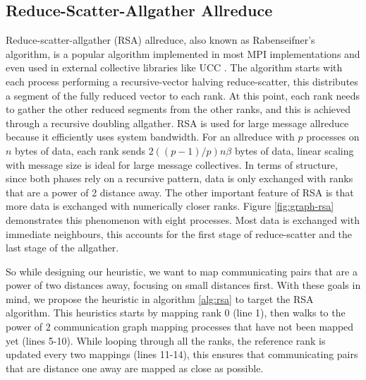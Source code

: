 

\subsection{Reduce-Scatter-Allgather Allreduce}
Reduce-scatter-allgather (RSA) allreduce, also known as Rabenseifner's algorithm, is a popular algorithm implemented in most MPI implementations and even used in external collective libraries like UCC \cite{UCC}.
The algorithm starts with each process performing a recursive-vector halving reduce-scatter, this distributes a segment of the fully reduced vector to each rank.
At this point, each rank needs to gather the other reduced segments from the other ranks, and this is achieved through a recursive doubling allgather.
RSA is used for large message allreduce because it efficiently uses system bandwidth.
For an allreduce with $p$ processes on $n$ bytes of data, each rank sends $2((p-1)/p)n\beta$ bytes of data, linear scaling with message size is ideal for large message collectives.
In terms of structure, since both phases rely on a recursive pattern, data is only exchanged with ranks that are a power of 2 distance away.
The other important feature of RSA is that more data is exchanged with numerically closer ranks.
Figure \ref{fig:graph-rsa} demonstrates this phenomenon with eight processes.
Most data is exchanged with immediate neighbours, this accounts for the first stage of reduce-scatter and the last stage of the allgather.

So while designing our heuristic, we want to map communicating pairs that are a power of two distances away, focusing on small distances first.
With these goals in mind, we propose the heuristic in algorithm \ref{alg:rsa} to target the RSA algorithm.
This heuristics starts by mapping rank 0 (line 1), then walks to the power of 2 communication graph mapping processes that have not been mapped yet (lines 5-10). 
While looping through all the ranks, the reference rank is updated every two mappings (lines 11-14), this ensures that communicating pairs that are distance one away are mapped as close as possible. 




